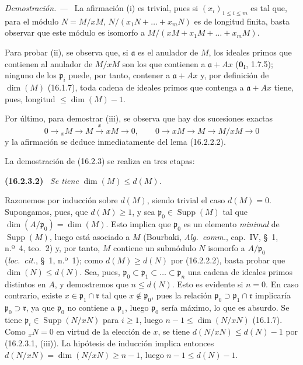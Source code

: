 \documentclass[10pt,oneside]{book}
\makeatletter
\newcommand{\setmanualcurrentlabel}[1]{\def\@currentlabel{#1}}
\newcommand{\oldpage}[2][]{%
  \setcounter{footnote}{0}%
  \marginpar{\scriptsize\textbf{#1}~|~#2}\ignorespaces}
\newenvironment{env}[1][]{\setmanualcurrentlabel{#1}\par\medskip\noindent\textbf{(#1)}\ }{\par}
\newenvironment{proof}{%
  \par\medskip\noindent\textit{Demostración. ---\ }}{\par}
\providecommand{\setmin}{-}%
\makeatother
\begin{document}
\begin{proof}
La afirmación (i) es trivial, pues si $(x_i)_{1\leq i\leq m}$ es tal que, para
el módulo $N=M/xM$, $N/(x_1N+\ldots+x_mN)$ es de longitud finita, basta
observar que este módulo es isomorfo a
$M/(xM+x_1M+\ldots+x_mM)$.

Para probar (ii), se observa que, si $\mathfrak{a}$ es el anulador de $M$, los
ideales primos que contienen al anulador de $M/xM$ son los que contienen a
$\mathfrak{a}+Ax$ ($\mathbf{0}_{\mathrm I}$, 1.7.5); ninguno de los
$\mathfrak{p}_i$ puede, por tanto, contener a $\mathfrak{a}+Ax$ y, por
definición de $\dim(M)$ (16.1.7), toda cadena de ideales primos que contenga a
$\mathfrak{a}+Ax$ tiene, pues, longitud $\leq\dim(M)\setmin 1$.

\oldpage[0\textsubscript{IV-1}]{27}

Por último, para demostrar (iii), se observa que hay dos sucesiones exactas
\[
  0\to{}_xM\to M\xrightarrow{x}xM\to0,\qquad
  0\to xM\to M\to M/xM\to0
\]
y la afirmación se deduce inmediatamente del lema (16.2.2.2).
\end{proof}

La demostración de (16.2.3) se realiza en tres etapas:

\begin{env}[16.2.3.2]
\label{0.16.2.3.2-es}
\emph{Se tiene} $\dim(M)\leq d(M)$.
\end{env}

Razonemos por inducción sobre $d(M)$, siendo trivial el caso $d(M)=0$.
Supongamos, pues, que $d(M)\geq1$, y sea
$\mathfrak{p}_0\in\operatorname{Supp}(M)$ tal que
$\dim(A/\mathfrak{p}_0)=\dim(M)$. Esto implica que $\mathfrak{p}_0$ es un
elemento \emph{minimal} de $\operatorname{Supp}(M)$, luego está asociado a $M$
(Bourbaki, \emph{Alg.~comm.}, cap.~IV, \S~1, n.º~4, teo.~2) y, por tanto, $M$
contiene un submódulo $N$ isomorfo a $A/\mathfrak{p}_0$ (\emph{loc.~cit.},
\S~1, n.º~1); como $d(M)\geq d(N)$ por (16.2.2.2), basta probar que
$\dim(N)\leq d(N)$. Sea, pues,
$\mathfrak{p}_0\subset\mathfrak{p}_1\subset\ldots\subset\mathfrak{p}_n$ una
cadena de ideales primos distintos en $A$, y demostremos que $n\leq d(N)$.
Esto es evidente si $n=0$. En caso contrario, existe
$x\in\mathfrak{p}_1\cap\mathfrak{r}$ tal que $x\notin\mathfrak{p}_0$, pues la
relación $\mathfrak{p}_0\supset\mathfrak{p}_1\cap\mathfrak{r}$ implicaría
$\mathfrak{p}_0\supset\mathfrak{r}$, ya que $\mathfrak{p}_0$ no contiene a
$\mathfrak{p}_1$, luego $\mathfrak{p}_0$ sería máximo, lo que es absurdo.
Se tiene $\mathfrak{p}_i\in\operatorname{Supp}(N/xN)$ para $i\geq1$, luego
$n\setmin 1\leq\dim(N/xN)$ (16.1.7). Como ${}_xN=0$ en virtud de la elección de $x$,
se tiene $d(N/xN)\leq d(N)\setmin 1$ por (16.2.3.1, (iii)). La hipótesis de inducción
implica entonces $d(N/xN)=\dim(N/xN)\geq n\setmin 1$, luego
$n-1\leq d(N)\setmin 1$.
\end{document}
